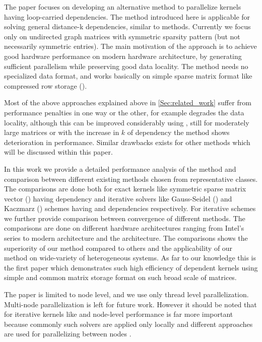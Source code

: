 The paper focuses on developing an alternative method to parallelize kernels having loop-carried dependencies. The method introduced here is applicable for solving general distance-k dependencies, similar to \MCfull methods. Currently we focus only on undirected graph \ie matrices with symmetric sparsity pattern (but not necessarily symmetric entries). The main motivation of the approach is to achieve good hardware performance on modern hardware architecture, by generating sufficient parallelism while preserving good data locality. The method needs no specialized data format, and works basically on simple sparse matrix format like compressed row storage (\CRS).

Most of the above approaches explained above in \cref{Sec:related_work} suffer from performance penalties in one way or the other, for example \MCfull degrades the data locality, although this can be improved considerably using \ABMCfull, still for moderately large matrices or with the increase in $k$ of \DK dependency the method shows deterioration in performance. Similar drawbacks exists for other methods which will be discussed within this paper.

In this work we provide a detailed performance analysis of the method and comparison between different existing methods chosen from representative classes. The comparisons are done both for exact kernels like symmetric sparse matrix vector (\SymmSpmv) having \DTWO dependency and iterative solvers like Gauss-Seidel (\GS) and Kaczmarz (\KACZ) schemes having \DONE and \DTWO dependencies respectively. For iterative schemes we further provide comparison between convergence of different methods. The comparisons are done on different hardware architectures ranging from Intel's \IVB series to modern \SKX architecture and the \AMD \EPY architecture. The comparisons shows the superiority of our method compared to others and the applicability of our method on wide-variety of heterogeneous systems. As far to our knowledge this is the first paper which demonstrates such high efficiency of \DTWO dependent kernels using simple and common \CRS matrix storage format on such broad scale of matrices.

The paper is limited to node level, and we use only thread level parallelization. Multi-node parallelization is left for future work. However it should be noted that for iterative kernels like \KACZ and \GS node-level performance is far more important because commonly such solvers are applied only locally and different approaches are used for parallelizing between nodes \cite{hpcg,CARP}.

\begin{comment}
As a final application run we demonstrate the parallelization of an eigen-value solver called FEAST \cite{FEAST}, where we use an iterative inner linear solver based on Kaczmarz method. The result presented is the first to achieve such high performance on node level for an iterative solver and is superior to the previous results published \cite{feast_mc}.
\end{comment}
